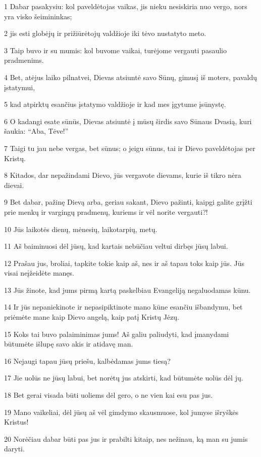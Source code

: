 \par 1 Dabar pasakysiu: kol paveldėtojas vaikas, jis nieku nesiskiria nuo vergo, nors yra visko šeimininkas; 
\par 2 jis esti globėjų ir prižiūrėtojų valdžioje iki tėvo nustatyto meto. 
\par 3 Taip buvo ir su mumis: kol buvome vaikai, turėjome vergauti pasaulio pradmenims. 
\par 4 Bet, atėjus laiko pilnatvei, Dievas atsiuntė savo Sūnų, gimusį iš moters, pavaldų įstatymui, 
\par 5 kad atpirktų esančius įstatymo valdžioje ir kad mes įgytume įsūnystę. 
\par 6 O kadangi esate sūnūs, Dievas atsiuntė į mūsų širdis savo Sūnaus Dvasią, kuri šaukia: “Aba, Tėve!” 
\par 7 Taigi tu jau nebe vergas, bet sūnus; o jeigu sūnus, tai ir Dievo paveldėtojas per Kristų. 
\par 8 Kitados, dar nepažindami Dievo, jūs vergavote dievams, kurie iš tikro nėra dievai. 
\par 9 Bet dabar, pažinę Dievą arba, geriau sakant, Dievo pažinti,­ kaipgi galite grįžti prie menkų ir vargingų pradmenų, kuriems ir vėl norite vergauti?! 
\par 10 Jūs laikotės dienų, mėnesių, laikotarpių, metų. 
\par 11 Aš baiminuosi dėl jūsų, kad kartais nebūčiau veltui dirbęs jūsų labui. 
\par 12 Prašau jus, broliai, tapkite tokie kaip aš, nes ir aš tapau toks kaip jūs. Jūs visai neįžeidėte manęs. 
\par 13 Jūs žinote, kad jums pirmą kartą paskelbiau Evangeliją negaluodamas kūnu. 
\par 14 Ir jūs nepaniekinote ir nepasipiktinote mano kūne esančiu išbandymu, bet priėmėte mane kaip Dievo angelą, kaip patį Kristų Jėzų. 
\par 15 Koks tai buvo palaiminimas jums! Aš galiu paliudyti, kad įmanydami būtumėte išlupę savo akis ir atidavę man. 
\par 16 Nejaugi tapau jūsų priešu, kalbėdamas jums tiesą? 
\par 17 Jie uolūs ne jūsų labui, bet norėtų jus atskirti, kad būtumėte uolūs dėl jų. 
\par 18 Bet gerai visada būti uoliems dėl gero, o ne vien kai esu pas jus. 
\par 19 Mano vaikeliai, dėl jūsų aš vėl gimdymo skausmuose, kol jumyse išryškės Kristus! 
\par 20 Norėčiau dabar būti pas jus ir prabilti kitaip, nes nežinau, ką man su jumis daryti. 
